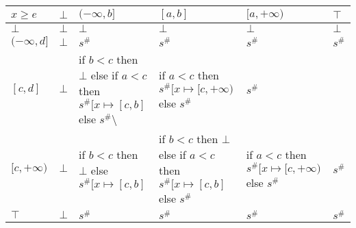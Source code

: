 \documentclass{article}
\begin{document}
            \begin{table}
                \begin{tabular}{|l|l|l|l|l|l|}
                \hline
                $x \ge e$      & $\bot$ & $(-\infty, b]$                                                                                            & $[a, b]$                                                                                        & $[a, +\infty)$                                            & $\top$ \\ \hline
                $\bot$         & $\bot$ & $\bot$                                                                                                    & $\bot$                                                                                          & $\bot$                                                    & $\bot$ \\ \hline
                $(-\infty, d]$ & $\bot$ & $s^\#$                                                                                                    & $s^\#$                                                                                          & $s^\#$                                                    & $s^\#$ \\ \hline
                $[c, d]$       & $\bot$ & if $b < c$ then $\bot$ else if $a < c$ then $s^\#[x \mapsto [c, b]$ else $s^\#$\textbackslash{} & if $a < c$ then $s^\#[x \mapsto [c, +\infty)$ else $s^\#$ & $s^\#$ \\ \hline
                $[c, +\infty)$ & $\bot$ & if $b < c$ then $\bot$ else $s^\#[x \mapsto [c, b]$                                                       & if $b < c$ then $\bot$ else if $a < c$ then $s^\#[x \mapsto [c, b]$ else $s^\#$                 & if $a < c$ then $s^\#[x \mapsto [c, +\infty)$ else $s^\#$ & $s^\#$ \\ \hline
                $\top$         & $\bot$ & $s^\#$                                                                                                    & $s^\#$                                                                                          & $s^\#$                                                    & $s^\#$ \\ \hline
                \end{tabular}
                \end{table}
\end{document}
